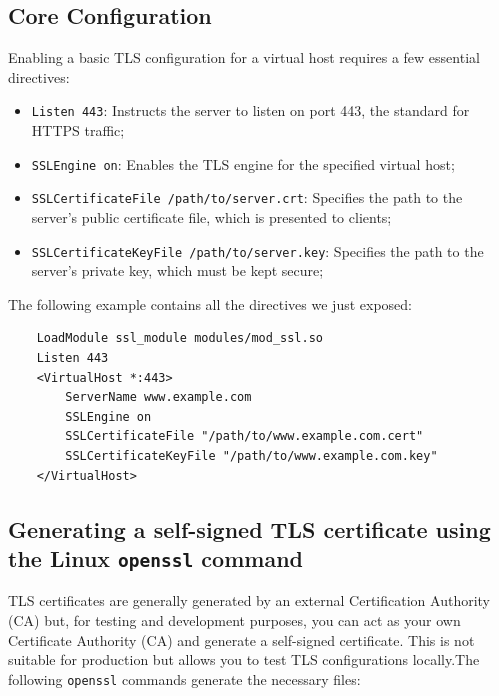 \documentclass{scrbook}
\begin{document}
	\subsection{Core Configuration}
	
	Enabling a basic TLS configuration for a virtual host requires a few essential directives:
	\begin{itemize}
		\item \texttt{Listen 443}: Instructs the server to listen on port 443, the standard for HTTPS traffic;
		
		\item \texttt{SSLEngine on}: Enables the TLS engine for the specified virtual host;
		
		\item \texttt{SSLCertificateFile /path/to/server.crt}: Specifies the path to the server's public certificate file, which is presented to clients;
		
		\item \texttt{SSLCertificateKeyFile /path/to/server.key}: Specifies the path to the server's private key, which must be kept secure;
	\end{itemize}
	
	The following example contains all the directives we just exposed:
	
	\begin{lstlisting}
	LoadModule ssl_module modules/mod_ssl.so
	Listen 443
	<VirtualHost *:443>
		ServerName www.example.com
		SSLEngine on
		SSLCertificateFile "/path/to/www.example.com.cert"
		SSLCertificateKeyFile "/path/to/www.example.com.key"
	</VirtualHost>
	\end{lstlisting}
	
	\subsection{Generating a self-signed TLS certificate using the Linux \texttt{openssl} command}
	
	TLS certificates are generally generated by an external Certification Authority (CA) but, for testing and development purposes, you can act as your own Certificate Authority (CA) and generate a self-signed certificate. This is not suitable for production but allows you to test TLS configurations locally.The following \texttt{openssl} commands generate the necessary files:
	
\end{document}
